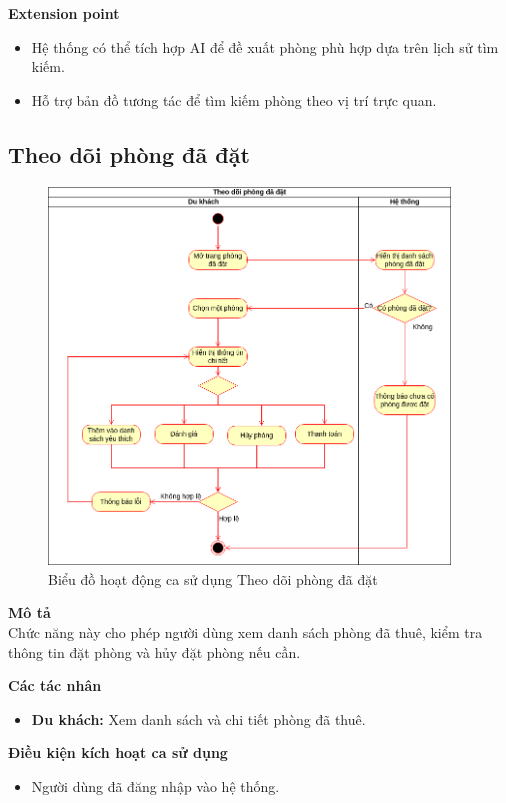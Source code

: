 \textbf{Extension point}
\begin{itemize}
    \item Hệ thống có thể tích hợp AI để đề xuất phòng phù hợp dựa trên lịch sử tìm kiếm.
    \item Hỗ trợ bản đồ tương tác để tìm kiếm phòng theo vị trí trực quan.
\end{itemize}

\subsection{Theo dõi phòng đã đặt}
\begin{figure}[H]
    \centering
    \includegraphics[width=0.95\textwidth]{img/1.Tuyền-Tra cứu thông tin phòng đã thuê.drawio.png}
    \caption{Biểu đồ hoạt động ca sử dụng Theo dõi phòng đã đặt}
\end{figure}
\textbf{\indent Mô tả}\\
\indent Chức năng này cho phép người dùng xem danh sách phòng đã thuê, kiểm tra thông tin đặt phòng và hủy đặt phòng nếu cần.

\textbf{Các tác nhân}
\begin{itemize}
    \item \textbf{Du khách:}  Xem danh sách và chi tiết phòng đã thuê.
\end{itemize}

\textbf{Điều kiện kích hoạt ca sử dụng}
\begin{itemize}
    \item Người dùng đã đăng nhập vào hệ thống.
\end{itemize}

